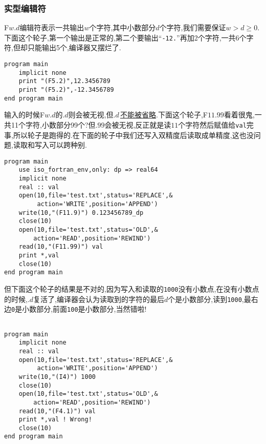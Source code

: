 \subsubsection{实型编辑符}

F$w.d$编辑符表示一共输出$w$个字符,其中小数部分$d$个字符,我们需要保证$w>d\geqslant0$.下面这个轮子,第一个输出是正常的,第二个要输出``\texttt{-12.}''再加2个字符,一共6个字符,但却只能输出5个,编译器又摆烂了.
\begin{lstlisting}
program main
    implicit none
    print "(F5.2)",12.3456789
    print "(F5.2)",-12.3456789
end program main
\end{lstlisting}

输入的时候F$w.d$的$.d$则会被无视,但$.d\,$\uline{不能被省略}.下面这个轮子,F$11.99$看着很鬼,一共11个字符,小数部分99个?但$.99$会被无视,反正就是读$11$个字符然后赋值给\texttt{val}完事,所以轮子是跑得的.在下面的轮子中我们还写入双精度后读取成单精度,这也没问题,读取和写入可以跨种别.
\begin{lstlisting}
program main
    use iso_fortran_env,only: dp => real64
    implicit none
    real :: val
    open(10,file='test.txt',status='REPLACE',&
         action='WRITE',position='APPEND')
    write(10,"(F11.9)") 0.123456789_dp
    close(10)
    open(10,file='test.txt',status='OLD',&
        action='READ',position='REWIND')
    read(10,"(F11.99)") val
    print *,val
    close(10)
end program main
\end{lstlisting}
但下面这个轮子的结果是不对的,因为写入和读取的\texttt{1000}没有小数点,在没有小数点的时候,$.d$复活了,编译器会认为读取到的字符的最后$d$个是小数部分,读到\texttt{1000},最右边\texttt{0}是小数部分,前面\texttt{100}是小数部分,当然错啦!
\begin{lstlisting}

program main
    implicit none
    real :: val
    open(10,file='test.txt',status='REPLACE',&
         action='WRITE',position='APPEND')
    write(10,"(I4)") 1000
    close(10)
    open(10,file='test.txt',status='OLD',&
        action='READ',position='REWIND')
    read(10,"(F4.1)") val
    print *,val ! Wrong!
    close(10)
end program main
\end{lstlisting}

